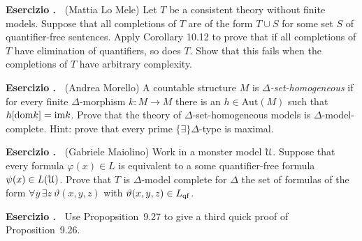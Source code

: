 \documentclass[10pt]{article}
\def\phi{\varphi}
\def\theta{\vartheta}
\def\U{\EuScript U}
\def\E{\exists}
\def\A{\forall}
\def\range{\textrm{im}}
\def\Aut{\textrm{Aut}}
\def\dom{{\rm dom}}
\newcounter{ex}
\newenvironment{exercise}{\bigskip\addtocounter{ex}{1}\textbf{Esercizio \theex.\ }}{}
\begin{document}
\begin{exercise}
  (Mattia Lo Mele)
  Let $T$ be a consistent theory without finite models.
  Suppose that all completions of $T$ are of the form $T\cup S$ for some set $S$ of quantifier-free sentences.
  Apply Corollary 10.12 to prove that if all completions of $T$ have elimination of quantifiers, so does $T$.
  Show that this fails when the completions of $T$ have arbitrary complexity.
\end{exercise}

\begin{exercise}
(Andrea Morello)
A countable structure $M$ is $\Delta$\textit{-set-homogeneous\/} if for every finite $\Delta$-mor\-phism $k:M\to M$ there is an $h\in\Aut(M)$ such that $h[\dom k]=\range k$.
Prove that the theory of $\Delta$-set-homogeneous models is $\Delta$-model-complete. 
Hint: prove that every prime $\{\E\}\Delta$-type is maximal.
\end{exercise}

\begin{exercise}
  (Gabriele Maiolino)
  Work in a monster model $\U$.
  Suppose that every formula $\phi(x)\in L$ is equivalent to a some quantifier-free formula $\psi(x)\in L(\U)$.
  Prove that $T$ is $\Delta$-model complete for $\Delta$ the set of formulas of the form $\A y\,\E z\ \theta(x,y,z)$ with $\theta(x,y,z)\in L_{\rm qf}$.
\end{exercise}

\begin{exercise}
  Use Propopsition~9.27 to give a third quick proof of Proposition~9.26.
\end{exercise}
\end{document}
